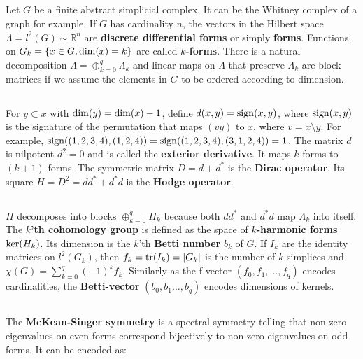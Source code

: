 \documentclass[12pt]{amsart}
\let\paragraph\subsection
\begin{document}
\paragraph{}
Let $G$ be a finite abstract simplicial complex. It can be the Whitney complex of a graph for example.
If $G$ has cardinality $n$, the vectors in the Hilbert space 
$\Lambda=l^2(G) \sim \mathbb{R}^n$ are {\bf discrete differential forms} or simply {\bf forms}. 
Functions on $G_k = \{ x \in G, {\rm dim}(x)=k \}$ are called {\bf $k$-forms}. 
There is a natural decomposition $\Lambda = \oplus_{k=0}^q \Lambda_k$ and linear maps on $\Lambda$
that preserve $\Lambda_k$ are block matrices if we assume the elements in $G$ to be ordered according
to dimension.

\paragraph{}
For $y \subset x$ with ${\rm dim}(y)={\rm dim}(x)-1$, define $d(x,y) = {\rm sign}(x,y)$,
where ${\rm sign}(x,y)$ is the signature of the permutation that maps 
$(vy)$ to $x$, where $v=x \setminus y$. For example, 
${\rm sign}( (1,2,3,4),(1,2,4) ) = {\rm sign}( (1,2,3,4),(3,1,2,4) ) = 1$. The matrix $d$ is 
nilpotent $d^2=0$ and is called the {\bf exterior derivative}. It maps $k$-forms to $(k+1)$-forms. 
The symmetric matrix $D=d+d^*$ is the {\bf Dirac operator}. 
Its square $H=D^2 = d d^* + d^* d$ is the {\bf Hodge operator}. 

\paragraph{}
$H$ decomposes into blocks $\oplus_{k=0}^q H_k$ because both $d d^*$ and $d^* d$ map $\Lambda_k$
into itself. The {\bf $k$'th cohomology group} is defined as the space of {\bf $k$-harmonic forms} 
${\rm ker}(H_k)$. Its dimension is the $k$'th {\bf Betti number} $b_k$ of $G$. 
If $I_k$ are the identity matrices on $l^2(G_k)$, then 
$f_k={\rm tr}(I_k) = |G_k|$ is the number of $k$-simplices and $\chi(G)=\sum_{k=0}^{q} (-1)^k f_k$.  
Similarly as the f-vector $(f_0,f_1, \dots, f_q)$ encodes cardinalities, 
the {\bf Betti-vector} $(b_0,b_1 \dots, b_q)$ encodes dimensions of kernels. 

\paragraph{}
The {\bf McKean-Singer symmetry} is a spectral symmetry telling that non-zero eigenvalues on
even forms correspond bijectively to non-zero eigenvalues on odd forms. It can be encoded as:
\end{document}

